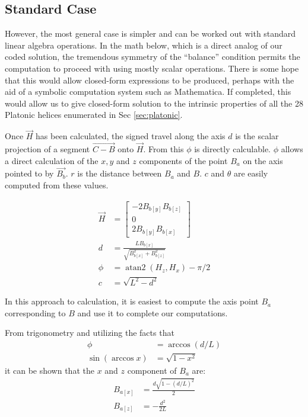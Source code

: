 \documentclass{svproc}
\DeclareMathOperator{\atantwo}{atan2}
\begin{document}
\subsection{Standard Case}

However, the most general case is simpler and can be worked
out with standard linear algebra operations. In the math below,
which is a direct analog of our coded solution, the tremendous symmetry of the ``balance'' condition
permits the computation to proceed with
using mostly scalar operations. There is some hope that
this would allow closed-form expressions to be produced, perhaps
with the aid of a symbolic computation system such as
Mathematica\cite{Mathematica}. If completed, this would
allow us to give closed-form solution to the intrinsic properties
of all the 28 Platonic helices enumerated in Sec \ref{sec:platonic}.

Once $\overrightarrow{H}$ has been calculated, the signed travel along the axis $d$ is
the scalar projection of a segment $\overrightarrow{C - B}$ onto $\overrightarrow{H}$.
From this $\phi$ is directly calculable. $\phi$ allows
a direct calculation of the $x,y$ and $z$ components of the
point $B_a$ on the axis pointed to by $\overrightarrow{B_b}$.
$r$ is the distance between $B_a$ and $B$. $c$ and $\theta$
are easily computed from these values.

\begin{align}
  \overrightarrow{H} &=  \begin{bmatrix} -2 B_{b[y]} B_{b[z]} \\ 0 \\ 2 B_{b[y]} B_{b[x]}  \end{bmatrix} \\
  d &= \frac{L B_{b[x]}}{\sqrt{B_{b[x]}^2 + B_{b[z]}^2}}  \\
  \phi &= \atantwo{(H_z,H_x)} - \pi/2  \\
  c &= \sqrt{L^2 - d^2}
\end{align}

In this approach to calculation, it is easiest
to compute the axis point $B_a$ corresponding to $B$ and
use it to complete our computations.

From trigonometry and utilizing the facts that
\begin{align}
\phi &= \arccos{(d/L)} \\
\sin{(\arccos{x})} &= \sqrt{1 - x^2}
\end{align}
  it
can be shown that
the $x$ and $z$ component of $B_a$ are:
\begin{align}
  B_{a[x]} &= \frac{d\sqrt{1 - (d/L)^2}}{2} \\
  B_{a[z]} &= -\frac{d^2}{2L}
\end{align}
\end{document}
